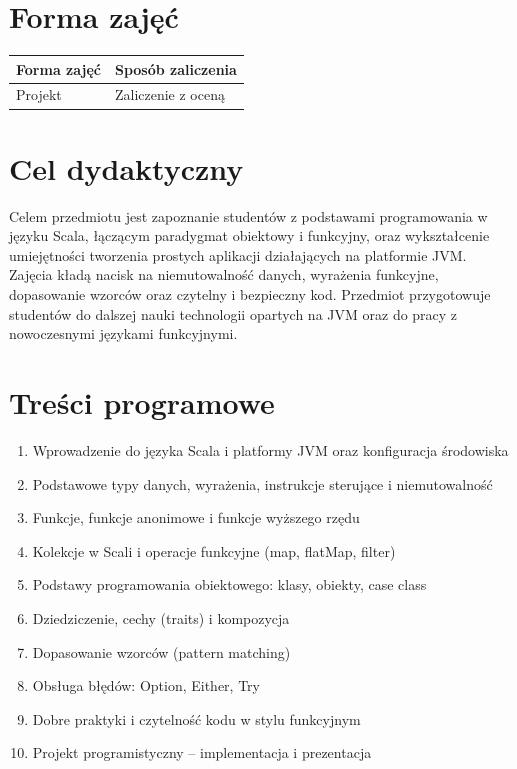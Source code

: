\documentclass[12pt, a4paper]{article}
\begin{document}
\section{Forma zajęć}

\begin{tabular}{ll}
  \hline
  \textbf{Forma zajęć} & \textbf{Sposób zaliczenia} \\
  \hline
  Projekt & Zaliczenie z oceną \\
  \hline
\end{tabular}

\section{Cel dydaktyczny}

Celem przedmiotu jest zapoznanie studentów z podstawami programowania w języku Scala, łączącym paradygmat obiektowy i funkcyjny, oraz wykształcenie umiejętności tworzenia prostych aplikacji działających na platformie JVM. Zajęcia kładą nacisk na niemutowalność danych, wyrażenia funkcyjne, dopasowanie wzorców oraz czytelny i bezpieczny kod. Przedmiot przygotowuje studentów do dalszej nauki technologii opartych na JVM oraz do pracy z nowoczesnymi językami funkcyjnymi.

\section{Treści programowe}

\begin{enumerate}
  \item Wprowadzenie do języka Scala i platformy JVM oraz konfiguracja środowiska
  \item Podstawowe typy danych, wyrażenia, instrukcje sterujące i niemutowalność
  \item Funkcje, funkcje anonimowe i funkcje wyższego rzędu
  \item Kolekcje w Scali i operacje funkcyjne (map, flatMap, filter)
  \item Podstawy programowania obiektowego: klasy, obiekty, case class
  \item Dziedziczenie, cechy (traits) i kompozycja
  \item Dopasowanie wzorców (pattern matching)
  \item Obsługa błędów: Option, Either, Try
  \item Dobre praktyki i czytelność kodu w stylu funkcyjnym
  \item Projekt programistyczny – implementacja i prezentacja
\end{enumerate}
\end{document}
